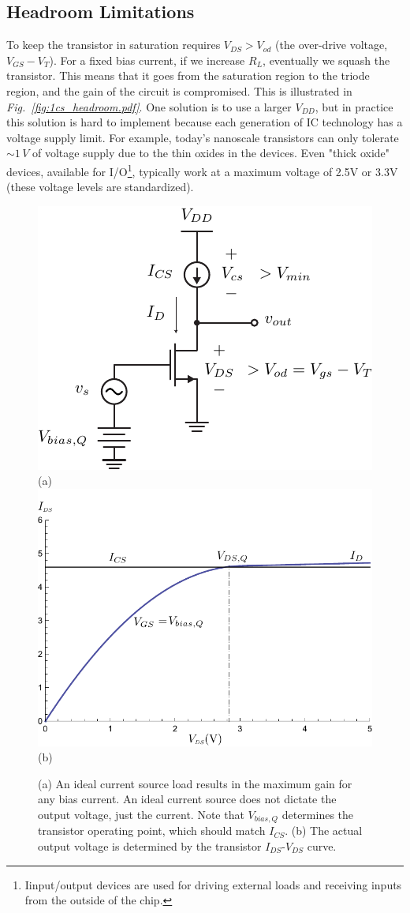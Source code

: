 \subsection{Headroom Limitations}
To keep the transistor in saturation requires $V_{DS} > V_{od}$ (the over-drive voltage, $V_{GS} - V_T$).  For a fixed bias current, if we increase $R_L$, eventually we squash the transistor.  This means that it goes from the saturation region to the triode region, and the gain of the circuit is compromised.  This is illustrated in \emph{Fig.~\ref{fig:1cs_headroom.pdf}}.  One solution is to use a larger $V_{DD}$, but in practice this solution is hard to implement because each generation of IC technology has a voltage supply limit.  For example, today's nanoscale transistors can only tolerate $\sim 1\,V$ of voltage supply due to the thin oxides in the devices.  Even "thick oxide" devices, available for I/O\footnote{Iinput/output devices are used for driving external loads and receiving inputs from the outside of the chip.}, typically work at a maximum voltage of 2.5V or 3.3V (these voltage levels are standardized).
\begin{figure}[t]
\centering
\includegraphics[width=.55\columnwidth]{2cs_current_mirror_load.pdf}\\
(a)\\
\includegraphics[width=.6\columnwidth]{mos_output_voltage.pdf}\\
(b)\\
\caption{(a) An ideal current source load results in the maximum gain for any bias current.  An ideal current source does not dictate the output voltage, just the current.  Note that $V_{bias,Q}$ determines the transistor operating point, which should match $I_{CS}$.  (b) The actual output voltage is determined by the transistor $I_{DS}$-$V_{DS}$ curve.}
\label{fig:2cs_current_mirror_load.pdf}
\end{figure}
